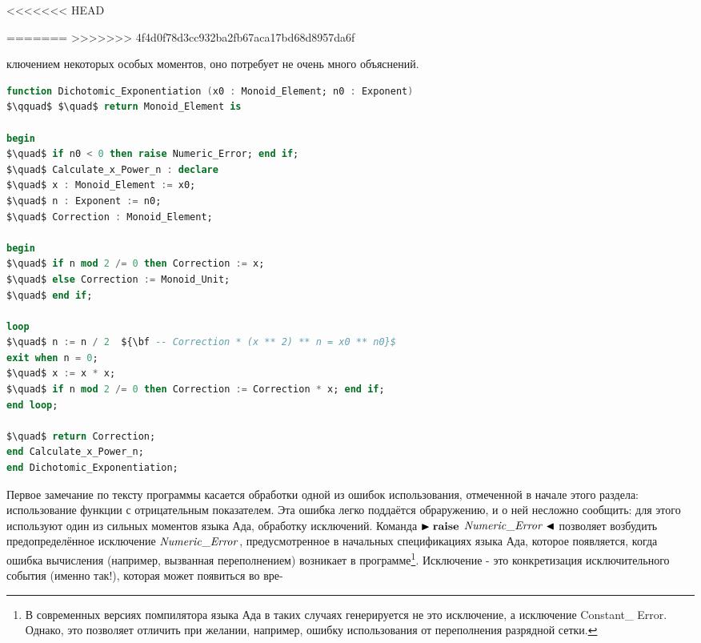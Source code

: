 <<<<<<< HEAD



%
=======
>>>>>>> 4f4d0f78d3cc932ba2fb67aca17bd68d8957da6f

\noindent ключением некоторых особых моментов, оно потребует не очень много объяснений.
\begin{lstlisting}[mathescape=true, language=Ada, basicstyle=\small]
function Dichotomic_Exponentiation (x0 : Monoid_Element; n0 : Exponent)
$\qquad$ $\quad$ return Monoid_Element is

begin
$\quad$ if n0 < 0 then raise Numeric_Error; end if;
$\quad$ Calculate_x_Power_n : declare
$\quad$ x : Monoid_Element := x0;
$\quad$ n : Exponent := n0;
$\quad$ Correction : Monoid_Element;

begin
$\quad$ if n mod 2 /= 0 then Correction := x;
$\quad$ else Correction := Monoid_Unit;
$\quad$ end if;

loop
$\quad$ n := n / 2  ${\bf -- Correction * (x ** 2) ** n = x0 ** n0}$
exit when n = 0;
$\quad$ x := x * x;
$\quad$ if n mod 2 /= 0 then Correction := Correction * x; end if;
end loop;

$\quad$ return Correction;
end Calculate_x_Power_n;
end Dichotomic_Exponentiation;

\end{lstlisting}
 
 \par Первое замечание по тексту программы касается обработки одной из ошибок использования, отмеченной в начале этого раздела: использование функции с отрицательным показателем. Эта ошибка легко поддаётся обраружению, и о ней несложно сообщить: для этого используют один из сильных моментов языка Ада, обработку исключений. Команда $\blacktriangleright {\bf raise}$ \linebreak ${\it Numeric\_Error} \blacktriangleleft$ позволяет возбудить предопределённое исключение \linebreak ${\it Numeric\_ Error}$, предусмотренное в начальных спецификациях языка Ада, которое появляется, когда ошибка вычисления (например, вызванная переполнением) возникает в программе\footnote{В современных версиях помпилятора языка Ада в таких случаях генерируется не это исключение, а исключение Constant\_ Error. Однако, это позволяет отличить при желании, например, ошибку использования от переполнения разрядной сетки.}. Исключение - это конкретизация исключительного события (именно так!), которая может появиться во вре- \linebreak
 \newpage
 

